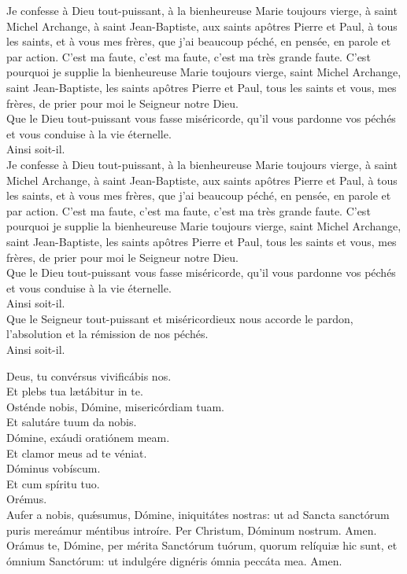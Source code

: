 \documentclass[twoside]{article}
\begin{document}
\begin{paracol}{2}
\vv Je confesse à Dieu tout-puissant, à la bienheureuse Marie toujours vierge, à saint Michel Archange, à saint Jean-Baptiste, aux saints apôtres Pierre et Paul, à tous les saints, et à vous mes frères, que j’ai beaucoup péché, en pensée, en parole et par action. C’est ma faute, c’est ma faute, c’est ma très grande faute. C’est pourquoi je supplie la bienheureuse Marie toujours vierge, saint Michel Archange, saint Jean-Baptiste, les saints apôtres Pierre et Paul, tous les saints et vous, mes frères, de prier pour moi le Seigneur notre Dieu. \\
\rr Que le Dieu tout-puissant vous fasse miséricorde, qu’il vous pardonne vos péchés et vous conduise à la vie éternelle. \\
\vv Ainsi soit-il. \\
\rr Je confesse à Dieu tout-puissant, à la bienheureuse Marie toujours vierge, à saint Michel Archange, à saint Jean-Baptiste, aux saints apôtres Pierre et Paul, à tous les saints, et à vous mes frères, que j’ai beaucoup péché, en pensée, en parole et par action.
C’est ma faute, c’est ma faute, c’est ma très grande faute. C’est pourquoi je supplie la bienheureuse Marie toujours vierge, saint Michel Archange, saint Jean-Baptiste, les saints apôtres Pierre et Paul, tous les saints et vous, mes frères, de prier pour moi le Seigneur notre Dieu. \\
\vv Que le Dieu tout-puissant vous fasse miséricorde, qu’il vous pardonne vos péchés et vous conduise à la vie éternelle. \\
\rr Ainsi soit-il.\\
\vv Que le Seigneur tout-puissant et miséricordieux nous accorde le pardon, l’absolution et la rémission de nos péchés.\\
\rr Ainsi soit-il.

\switchcolumn*

\vv Deus, tu convérsus vivificábis nos.\\
\rr Et plebs tua lætábitur in te.\\
\vv Osténde nobis, Dómine, misericórdiam tuam.\\
\rr Et salutáre tuum da nobis.\\
\vv Dómine, exáudi oratiónem meam.\\
\rr Et clamor meus ad te véniat.\\
\vv Dóminus vobíscum.\\
\rr Et cum spíritu tuo.\\
\vv Orémus. \\
Aufer a nobis, quǽsumus, Dómine, iniquitátes nostras: ut ad Sancta sanctórum puris mereámur méntibus introíre. Per Christum, Dóminum nostrum. Amen.\\
Orámus te, Dómine, per mérita Sanctórum tuórum, quorum relíquiæ hic sunt, et ómnium Sanctórum: ut indulgére dignéris ómnia peccáta mea. Amen.


\end{paracol}
\end{document}
